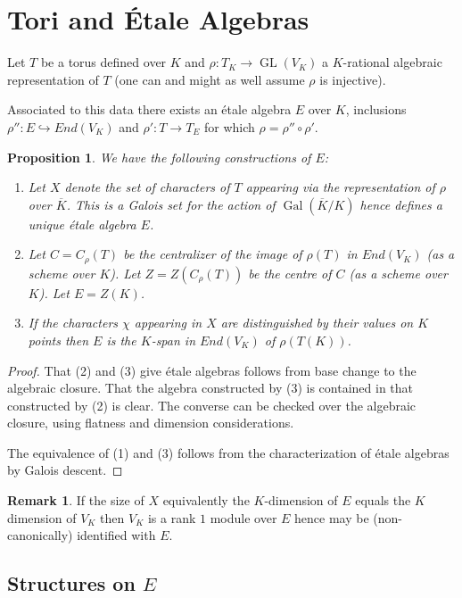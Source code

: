 \documentclass{article}
\theoremstyle{plain}
\newtheorem{proposition}[theorem]{Proposition}
\theoremstyle{definition}
\newtheorem{remark}[theorem]{Remark}
\DeclareMathOperator{\Gal}{Gal}
\DeclareMathOperator{\GL}{GL}
\begin{document}
\section{Tori and \'Etale Algebras}

Let $T$ be a torus defined over $K$ and $\rho:T_K \rightarrow \GL(V_K)$ a $K$-rational algebraic representation of $T$ (one can and might as well assume $\rho$ is injective).

Associated to this data there exists an \'etale algebra $E$ over $K$, inclusions $\rho'' : E \hookrightarrow End(V_K)$ and $\rho' : T \rightarrow T_E$ for which $\rho = \rho''\circ\rho'$.

\begin{proposition}
We have the following constructions of $E$:
\begin{enumerate}
\item Let $X$ denote the set of characters of $T$ appearing via the representation of $\rho$ over $\overline{K}$. This is a Galois set for the action of $\Gal(\overline{K}/K)$ hence defines a unique \'etale algebra $E$.
\item Let $C = C_\rho(T)$ be the centralizer of the image of $\rho(T)$ in $End(V_K)$ (as a scheme over $K$).
           Let $Z = Z(C_\rho(T))$ be the centre of $C$ (as a scheme over $K$).
           Let $E = Z(K)$.
\item If the characters $\chi$ appearing in $X$ are distinguished by their values on $K$ points then $E$ is the $K$-span in $End(V_K)$ of $\rho(T(K))$.
\end{enumerate}
\end{proposition}
\begin{proof}
That (2) and (3) give \'etale algebras follows from base change to the algebraic closure.
That the algebra constructed by (3) is contained in that constructed by (2) is clear.
The converse can be checked over the algebraic closure, using flatness and dimension considerations.

The equivalence of (1) and (3) follows from the characterization of \'etale algebras by Galois descent.
\end{proof}

\begin{remark}
If the size of $X$ equivalently the $K$-dimension of $E$ equals the $K$ dimension of $V_K$ then $V_K$ is a rank $1$ module over $E$ hence may be (non-canonically) identified with $E$.
\end{remark}

\subsection{Structures on $E$}
\end{document}
